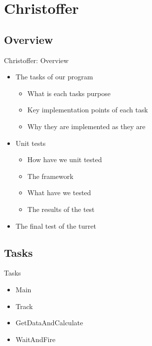 \section{Christoffer}
\subsection{Overview}

\begin{frame}{Christoffer: Overview}
\begin{itemize}
  \item The tasks of our program
  		\begin{itemize}
  			\item What is each tasks purpose
  			\item Key implementation points of each task
  			\item Why they are implemented as they are  
		\end{itemize}
  \item Unit tests
  		\begin{itemize}
  			\item How have we unit tested
  			\item The framework
  			\item What have we tested
  			\item The results of the test
		\end{itemize}
  \item The final test of the turret
\end{itemize}
\end{frame}

\subsection{Tasks}
\begin{frame}{Tasks}
\begin{itemize}
  \item Main
  \item Track
  \item GetDataAndCalculate
  \item WaitAndFire
\end{itemize}
\end{frame}

